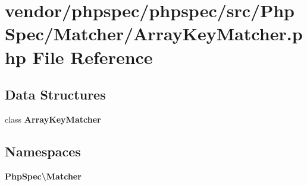 \section{vendor/phpspec/phpspec/src/\+Php\+Spec/\+Matcher/\+Array\+Key\+Matcher.php File Reference}
\label{_array_key_matcher_8php}
\subsection*{Data Structures}
\begin{DoxyCompactItemize}
\item 
class {\bf Array\+Key\+Matcher}
\end{DoxyCompactItemize}
\subsection*{Namespaces}
\begin{DoxyCompactItemize}
\item 
 {\bf Php\+Spec\textbackslash{}\+Matcher}
\end{DoxyCompactItemize}
